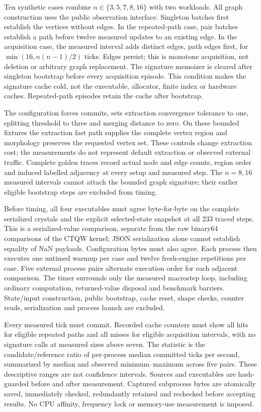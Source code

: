 \documentclass[11pt,a4paper]{article}
\theoremstyle{definition}\newtheorem{definition}[theorem]{Definition}
\begin{document}
Ten synthetic cases combine $n\in\{3,5,7,8,16\}$ with two workloads. All graph construction uses the public observation interface. Singleton batches first establish the vertices without edges. In the repeated-path case, pair batches establish a path before twelve measured updates to an existing edge. In the acquisition case, the measured interval adds distinct edges, path edges first, for $\min(16,n(n-1)/2)$ ticks. Edges persist; this is monotone acquisition, not deletion or arbitrary graph replacement. The signature memoizer is cleared after singleton bootstrap before every acquisition episode. This condition makes the signature cache cold, not the executable, allocator, finite index or hardware caches. Repeated-path episodes retain the cache after bootstrap.

The configuration forces commits, sets extraction convergence tolerance to one, splitting threshold to three and merging distance to zero. On these bounded fixtures the extraction fast path supplies the complete vertex region and morphology preserves the requested vertex set. These controls change extraction cost; the measurements do not represent default extraction or observed external traffic. Complete golden traces record actual node and edge counts, region order and induced labelled adjacency at every setup and measured step. The $n=8,16$ measured intervals cannot attach the bounded graph signature; their earlier eligible bootstrap steps are excluded from timing.

Before timing, all four executables must agree byte-for-byte on the complete serialized crystals and the explicit selected-state snapshot at all 233 traced steps. This is a serialized-value comparison, separate from the raw binary64 comparisons of the CTQW kernel; JSON serialization alone cannot establish equality of NaN payloads. Configuration bytes must also agree. Each process then executes one untimed warmup per case and twelve fresh-engine repetitions per case. Five external process pairs alternate execution order for each adjacent comparison. The timer surrounds only the measured macrostep loop, including ordinary computation, returned-value disposal and benchmark barriers. State/input construction, public bootstrap, cache reset, shape checks, counter reads, serialization and process launch are excluded.

Every measured tick must commit. Recorded cache counters must show all hits for eligible repeated paths and all misses for eligible acquisition intervals, with no signature calls at measured sizes above seven. The statistic is the candidate/reference ratio of per-process median committed ticks per second, summarized by median and observed minimum--maximum across five pairs. These descriptive ranges are not confidence intervals. Sources and executables are hash-guarded before and after measurement. Captured subprocess bytes are atomically saved, immediately checked, redundantly retained and rechecked before accepting results. No CPU affinity, frequency lock or memory-use measurement is imposed.
\end{document}

